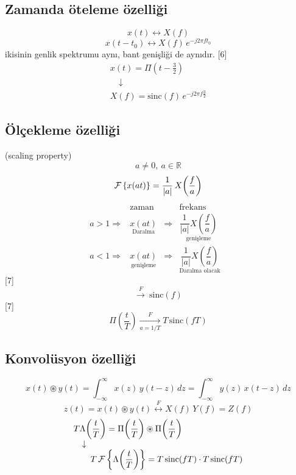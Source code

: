 \documentclass[11pt,a4paper]{article}
\begin{document}
\subsection{Zamanda öteleme özelliği}
\[ x(t)\longleftrightarrow X(f) \]
\[ x(t-t_0)\longleftrightarrow X(f)\,e^{-j2\pi ft_0} \]
ikisinin genlik spektrumu aynı, bant genişliği de aynıdır.
[6]
\[ \begin{array}{l} x(t)=\Pi\!\left(t-\tfrac{3}{2}\right)\\ \quad\downarrow\\ X(f)=\mathrm{sinc}(f)\,e^{-j2\pi f\frac{3}{2}} \end{array} \]

\subsection{Ölçekleme özelliği}
(scaling property)
\[ a\neq0,\ a\in\mathbb{R} \]
\[ \mathcal{F}\left\{x(at)\right\}=\frac{1}{|a|}\,X\!\left(\frac{f}{a}\right) \]
\[ \begin{array}{rcccl}
 & \text{zaman} & & \text{frekans} & \\
a>1\Rightarrow & \underset{\text{Daralma}}{x(at)} & \Rightarrow & \underset{\text{genişleme}}{\dfrac{1}{|a|}X\!\left(\dfrac{f}{a}\right)} & \\[10pt]
a<1\Rightarrow & \underset{\text{genişleme}}{x(at)} & \Rightarrow & \underset{\text{Daralma olacak}}{\dfrac{1}{|a|}X\!\left(\dfrac{f}{a}\right)} &
\end{array} \]
[7]
\[ \overset{F}{\longrightarrow}\ \mathrm{sinc}(f) \]
[7]
\[ \Pi\!\left(\frac{t}{T}\right)\xrightarrow[a=1/T]{F}T\,\mathrm{sinc}(fT) \]

\subsection{Konvolüsyon özelliği}
\[ x(t)\circledast y(t)=\int_{-\infty}^{\infty}x(z)\,y(t-z)\,dz=\int_{-\infty}^{\infty}y(z)\,x(t-z)\,dz \]
\[ z(t)=x(t)\circledast y(t)\overset{F}{\longleftrightarrow}X(f)\,Y(f)=Z(f) \]
\[ \begin{array}{l} T\Lambda\!\left(\dfrac{t}{T}\right)=\Pi\!\left(\dfrac{t}{T}\right)\circledast\Pi\!\left(\dfrac{t}{T}\right)\\ \quad\downarrow\\ \qquad T\,\mathcal{F}\left\{\Lambda\!\left(\dfrac{t}{T}\right)\right\}=T\,\mathrm{sinc}(fT)\cdot T\,\mathrm{sinc}(fT) \end{array} \]
\end{document}
